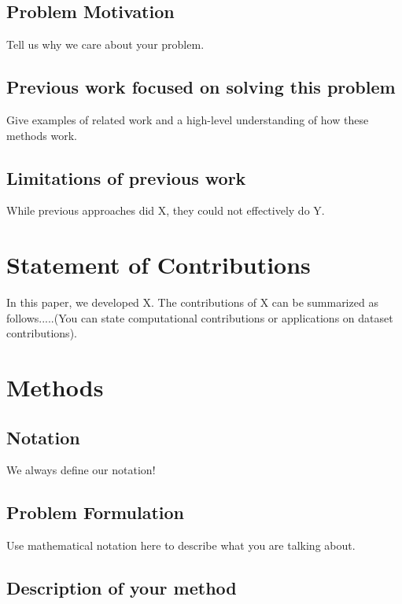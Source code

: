 \documentclass{article}
\begin{document}
\subsection{Problem Motivation}

Tell us why we care about your problem. 

\subsection{Previous work focused on solving this problem}

Give examples of related work and a high-level understanding of how these methods work.

\subsection{Limitations of previous work}

While previous approaches did X, they could not effectively do Y. 

\section{Statement of Contributions}

In this paper, we developed X. The contributions of X can be summarized as follows.....(You can state computational contributions or applications on dataset contributions). 

\section{Methods}

\subsection{Notation}

We always define our notation!

\subsection{Problem Formulation}

Use mathematical notation here to describe what you are talking about. 

\subsection{Description of your method}
\end{document}
